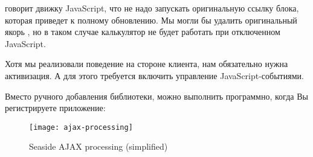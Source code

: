 \documentclass[a4paper,10pt,twoside]{book}
\begin{document}

 говорит движку JavaScript, что не надо запускать
оригинальную ссылку блока, которая приведет к полному обновлению.
Мы могли бы удалить оригинальный якорь , но в таком случае
калькулятор не будет работать при отключенном JavaScript.




Хотя мы реализовали поведение на стороне клиента, нам обязательно нужна
активизация. А для этого требуется включить управление
JavaScript-событиями.




Вместо ручного добавления библиотеки, можно выполнить программно,
когда Вы регистрируете приложение:
\begin{code}{}
MyCalculator class>>>initialize
	(self registerAsApplication: 'rpn')
		addLibrary: SULibrary}}
\end{code}

\begin{figure}[ht]
\begin{center}
\texttt{[image: ajax-processing]}
\caption{Seaside AJAX processing (simplified)}
\end{center}
\end{figure}
\end{document}
